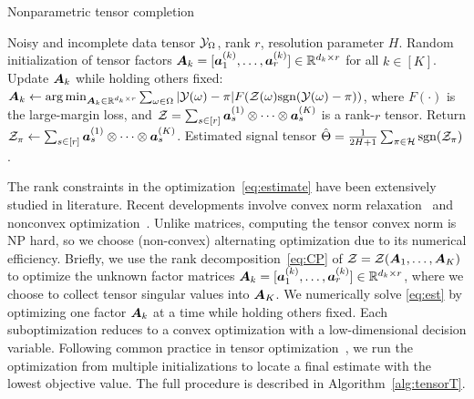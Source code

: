 \documentclass[11pt]{article}
\theoremstyle{plain}
\theoremstyle{definition}
\def\sign{\textup{sgn}}
\begin{document}
\begin{algorithm}[h!]
  \caption{Nonparametric tensor completion}\label{alg:tensorT}
 \begin{algorithmic}[1] 
\INPUT  Noisy and incomplete data tensor $\mathcal{Y}_\Omega$, rank $r$, resolution parameter $H$.
\State Random initialization of tensor factors $\bm A_k=[\bm{a}^{(k)}_1,\ldots,\bm{a}^{(k)}_r]\in\mathbb{R}^{d_k\times r}$ for all $k\in[K]$. 
\State Update $\bm A_k$ while holding others fixed: $\mA_k\leftarrow \argmin_{\mA_k\in\mathbb{R}^{d_k\times r}}\sum_{\omega\in \Omega} |\tY(\omega)-\pi|F(\tZ(\omega)\sign(\tY(\omega)-\pi))$, where $F(\cdot)$ is the large-margin loss, and $\mathcal{Z}=\sum_{s\in[r]} \bm{a}^{(1)}_s\otimes \cdots\otimes \bm{a}^{(K)}_s$ is a rank-$r$ tensor. 
\EndFor
\EndWhile
\State Return $\mathcal{Z}_\pi\leftarrow \sum_{s\in[r]} \bm{a}^{(1)}_s\otimes \cdots\otimes \bm{a}^{(K)}_s$.
\EndFor
\OUTPUT Estimated signal tensor $\hat \Theta={1\over 2H+1}\sum_{\pi \in \tH}\sign(\tZ_\pi)$.
    \end{algorithmic}
\end{algorithm}

The rank constraints in the optimization~\eqref{eq:estimate} have been extensively studied in literature. Recent developments involve convex norm relaxation~\citep{ghadermarzy2018learning} and nonconvex optimization~\citep{wang2018learning, han2020optimal}. Unlike matrices, computing the tensor convex norm is NP hard, so we choose (non-convex) alternating optimization due to its numerical efficiency. Briefly, we use the rank decomposition~\eqref{eq:CP} of $\mathcal{Z}=\mathcal{Z}(\bm A_1,\ldots, \bm A_K)$ to optimize the unknown factor matrices $\bm A_k=[\bm{a}^{(k)}_1,\ldots,\bm{a}^{(k)}_r]\in\mathbb{R}^{d_k\times r}$, where we choose to collect tensor singular values into $\bm A_K$. We numerically solve \eqref{eq:est} by optimizing one factor $\bm A_k$ at a time while holding others fixed. Each suboptimization reduces to a convex optimization with a low-dimensional decision variable. Following common practice in tensor optimization~\citep{anandkumar2014tensor,hong2020generalized}, we run the optimization from multiple initializations to locate a final estimate with the lowest objective value. The full procedure is described in Algorithm~\ref{alg:tensorT}.
\end{document}
